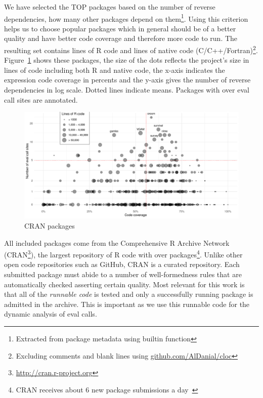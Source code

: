 \documentclass[conference]{IEEEtran}
\begin{document}
We have selected the TOP \CorpusPackages packages based on the number of reverse
dependencies, \ie how many other packages depend on them\footnote{Extracted from
  package metadata using builtin function}. Using this criterion helps us to
choose popular packages which in general should be of a better quality and have
better code coverage and therefore more code to run. The resulting set contains
\CorpusRCodeRnd lines of R code and \CorpusNativeCodeRnd lines of native code
(C/C++/Fortran)\footnote{Excluding comments and blank lines using
  \url{github.com/AlDanial/cloc}}. Figure~\ref{fig:corpus} shows these packages,
the size of the dots reflects the project's size in lines of code including both
R and native code, the x-axis indicates the expression code coverage in percents
and the y-axis gives the number of reverse dependencies in log scale. Dotted
lines indicate means. Packages with over \CorpusEvalsPackageTreshold eval call
sites are annotated.

\begin{figure}[!tb]\centering\includegraphics[width=\linewidth]
  {corpus.pdf}\caption{CRAN packages}\label{fig:corpus}
\end{figure}

All included packages come from the Comprehensive R Archive Network
(CRAN\footnote{\url{http://cran.r-project.org}}), the largest repository of R
code with over \CorpusAllCranRnd packages\footnote{CRAN receives about 6 new
  package submissions a day~\cite{Ligges2017}}. Unlike other open code
repositories such as GitHub, CRAN is a curated repository. Each submitted
package must abide to a number of well-formedness rules that are automatically
checked asserting certain quality. Most relevant for this work is that all of
the \emph{runnable code} is tested and only a successfully running package is
admitted in the archive. This is important as we use this runnable code for the
dynamic analysis of eval calls.
\end{document}
